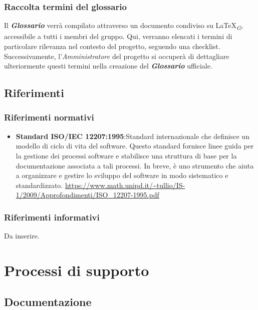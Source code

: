 \documentclass{article}
\begin{document}
\subsubsection{Raccolta termini del glossario}
Il \textbf{\textit{Glossario}} verrà compilato attraverso un documento condiviso su \LaTeX \textsubscript{\textit{G}}, accessibile a tutti i membri del gruppo. Qui, verranno elencati i termini di particolare rilevanza nel contesto del progetto, seguendo una checklist. Successivamente, l'\textit{Amministratore} del progetto si occuperà di dettagliare ulteriormente questi termini nella creazione del \textbf{\textit{Glossario}} ufficiale.

\subsection{Riferimenti}
\subsubsection{Riferimenti normativi}
\begin{itemize}
    \item \textbf{Standard ISO/IEC 12207:1995}:Standard internazionale che definisce un modello di ciclo di vita del software.
          Questo standard fornisce linee guida per la gestione dei processi software e stabilisce una struttura di base per la documentazione associata a tali processi.
          In breve, è uno strumento che aiuta a organizzare e gestire lo sviluppo del software in modo sistematico e standardizzato.
          \href{https://www.math.unipd.it/~tullio/IS-1/2009/Approfondimenti/ISO_12207-1995.pdf}{\url{https://www.math.unipd.it/~tullio/IS-1/2009/Approfondimenti/ISO_12207-1995.pdf}}

\end{itemize}
\subsubsection{Riferimenti informativi}
Da inserire.

\section{Processi di supporto}

\subsection{Documentazione}
\end{document}

